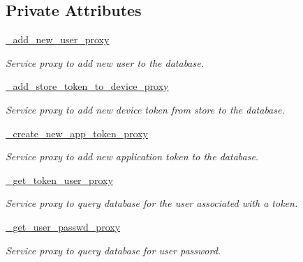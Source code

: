 \subsection*{Private Attributes}
\begin{DoxyCompactItemize}
\item 
\hyperlink{classrapp__application__authentication__manager_1_1database__handler_1_1DatabaseHandler_abff83e481ec569527cc83941c4e7ad46}{\-\_\-add\-\_\-new\-\_\-user\-\_\-proxy}
\begin{DoxyCompactList}\small\item\em Service proxy to add new user to the database. \end{DoxyCompactList}\item 
\hyperlink{classrapp__application__authentication__manager_1_1database__handler_1_1DatabaseHandler_a69b9c29be7e8360459e29eac7f54c4dd}{\-\_\-add\-\_\-store\-\_\-token\-\_\-to\-\_\-device\-\_\-proxy}
\begin{DoxyCompactList}\small\item\em Service proxy to add new device token from store to the database. \end{DoxyCompactList}\item 
\hyperlink{classrapp__application__authentication__manager_1_1database__handler_1_1DatabaseHandler_abe0a85fff839029dd6be19ce3eda291b}{\-\_\-create\-\_\-new\-\_\-app\-\_\-token\-\_\-proxy}
\begin{DoxyCompactList}\small\item\em Service proxy to add new application token to the database. \end{DoxyCompactList}\item 
\hyperlink{classrapp__application__authentication__manager_1_1database__handler_1_1DatabaseHandler_a1d6f0076f803ce6ace5305c98f9feaaa}{\-\_\-get\-\_\-token\-\_\-user\-\_\-proxy}
\begin{DoxyCompactList}\small\item\em Service proxy to query database for the user associated with a token. \end{DoxyCompactList}\item 
\hyperlink{classrapp__application__authentication__manager_1_1database__handler_1_1DatabaseHandler_afcee5506c1801addb0702d0c7b209d21}{\-\_\-get\-\_\-user\-\_\-passwd\-\_\-proxy}
\begin{DoxyCompactList}\small\item\em Service proxy to query database for user password. \end{DoxyCompactList}\item 

\end{DoxyCompactItemize}

